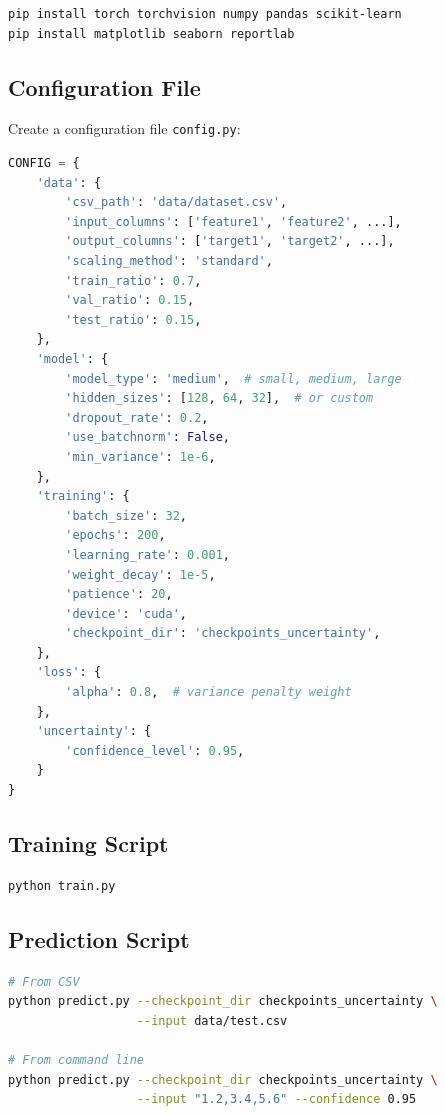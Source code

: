 \documentclass[11pt,a4paper]{article}
\begin{document}
\begin{lstlisting}[language=bash]
pip install torch torchvision numpy pandas scikit-learn
pip install matplotlib seaborn reportlab
\end{lstlisting}

\subsection{Configuration File}

Create a configuration file \texttt{config.py}:

\begin{lstlisting}[language=Python]
CONFIG = {
    'data': {
        'csv_path': 'data/dataset.csv',
        'input_columns': ['feature1', 'feature2', ...],
        'output_columns': ['target1', 'target2', ...],
        'scaling_method': 'standard',
        'train_ratio': 0.7,
        'val_ratio': 0.15,
        'test_ratio': 0.15,
    },
    'model': {
        'model_type': 'medium',  # small, medium, large
        'hidden_sizes': [128, 64, 32],  # or custom
        'dropout_rate': 0.2,
        'use_batchnorm': False,
        'min_variance': 1e-6,
    },
    'training': {
        'batch_size': 32,
        'epochs': 200,
        'learning_rate': 0.001,
        'weight_decay': 1e-5,
        'patience': 20,
        'device': 'cuda',
        'checkpoint_dir': 'checkpoints_uncertainty',
    },
    'loss': {
        'alpha': 0.8,  # variance penalty weight
    },
    'uncertainty': {
        'confidence_level': 0.95,
    }
}
\end{lstlisting}

\subsection{Training Script}

\begin{lstlisting}[language=bash]
python train.py
\end{lstlisting}

\subsection{Prediction Script}

\begin{lstlisting}[language=bash]
# From CSV
python predict.py --checkpoint_dir checkpoints_uncertainty \
                  --input data/test.csv

# From command line
python predict.py --checkpoint_dir checkpoints_uncertainty \
                  --input "1.2,3.4,5.6" --confidence 0.95
\end{lstlisting}
\end{document}
